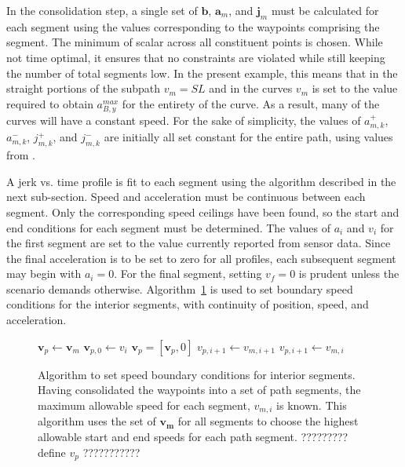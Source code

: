 \documentclass[letterpaper, 10 pt, conference]{ieeeconf}  %
\begin{document}
In the consolidation step, a single set of $\mathbf{b}$, $\mathbf{a}_m$, and $\mathbf{j}_m$ 
must be calculated for each segment using the values corresponding to the waypoints comprising the segment.
The minimum of scalar across all constituent points is chosen.
While not time optimal, it ensures that no constraints are violated while still keeping the number of total segments low.
In the present example, this means that in the straight portions of the subpath $v_m = SL$ and in the curves $v_m$ is set to the value required to obtain $a_{B,y}^{max}$ for the entirety of the curve.
As a result, many of the curves will have a constant speed.
For the sake of simplicity, the values of $a^+_{m,k}$, $a^-_{m,k}$, $j^+_{m,k}$, and $j^-_{m,k}$ are initially all set constant for the entire path, using values from \cite{Maurya2012,Hoberock1977,Long2000}.

A jerk vs. time profile is fit to each segment using the algorithm described in the next sub-section.
Speed and acceleration must be continuous between each segment. Only the corresponding speed ceilings have been found, so the start and end conditions for each segment must be determined.
The values of $a_i$ and $v_i$ for the first segment are set to the value currently reported from sensor data.
Since the final acceleration is to be set to zero for all profiles, each subsequent segment may begin with $a_i = 0$.
For the final segment, setting $v_f = 0$ is prudent unless the scenario demands otherwise.
Algorithm~\ref{alg:segmentspeedboundaryconditions} is used to set boundary speed conditions for the interior segments,
with continuity of position, speed, and acceleration.

\begin{figure}
  \begin{algorithmic}[1]
      \State $\mathbf{v}_p \gets \mathbf{v}_m$ 
      \State $\mathbf{v}_{p,0} \gets v_i$ 
      \State $\mathbf{v}_p = [\mathbf{v}_p, 0]$ 
          \State $v_{p,i+1} \gets v_{m,i+1}$
        \Else
          \State $v_{p,i+1} \gets v_{m,i}$
        \EndIf
      \EndFor
    \EndProcedure
  \end{algorithmic}
  \caption{
    Algorithm to set speed boundary conditions for interior segments.
    Having consolidated the waypoints into a set of path segments, the maximum allowable speed for each segment, $v_{m,i}$ is known.
    This algorithm uses the set of $\mathbf{v_{m}}$ for all segments to choose the highest allowable start and end speeds for each path segment.
    ????????? define $v_p$ ???????????
  }
\label{alg:segmentspeedboundaryconditions}
\end{figure}
\end{document}
